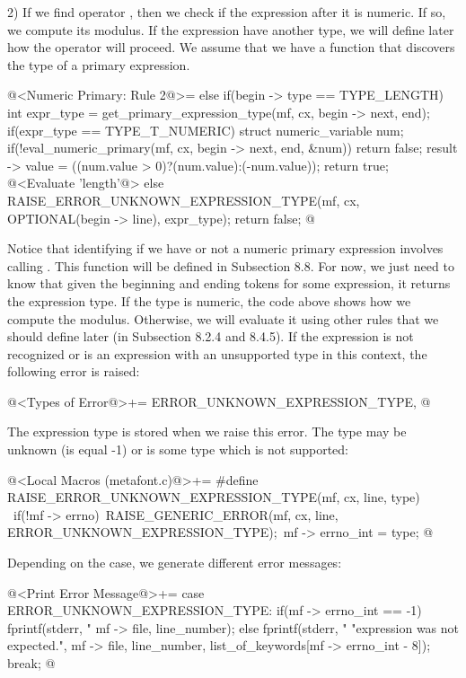 2) If we find operator , then we check if the
expression after it is numeric. If so, we compute its modulus. If the
expression have another type, we will define later how the operator
will proceed. We assume that we have a function that discovers the
type of a primary expression.

\iniciocodigo
@<Numeric Primary: Rule 2@>=
else if(begin -> type == TYPE_LENGTH){
  int expr_type = get_primary_expression_type(mf, cx, begin -> next, end);
  if(expr_type == TYPE_T_NUMERIC){
    struct numeric_variable num;
    if(!eval_numeric_primary(mf, cx, begin -> next, end, &num))
      return false;
    result -> value = ((num.value > 0)?(num.value):(-num.value));
    return true;
  }
  @<Evaluate 'length'@>
  else{
    RAISE_ERROR_UNKNOWN_EXPRESSION_TYPE(mf, cx, OPTIONAL(begin -> line),
                                       expr_type);
    return false;
  }
}
@
\fimcodigo

Notice that identifying if we have or not a numeric primary expression
involves calling . This
function will be defined in Subsection 8.8. For now, we just need to
know that given the beginning and ending tokens for some expression,
it returns the expression type. If the type is numeric, the code above
shows how we compute the modulus. Otherwise, we will evaluate it using
other rules that we should define later (in Subsection 8.2.4 and
8.4.5). If the expression is not recognized or is an expression with
an unsupported type in this context, the following error is raised:

\iniciocodigo
@<Types of Error@>+=
ERROR_UNKNOWN_EXPRESSION_TYPE,
@
\fimcodigo

The expression type is stored when we raise this error. The type may
be unknown (is equal -1) or is some type which is not supported:

\iniciocodigo
@<Local Macros (metafont.c)@>+=
#define RAISE_ERROR_UNKNOWN_EXPRESSION_TYPE(mf, cx, line, type) {\
  if(!mf -> errno){\
    RAISE_GENERIC_ERROR(mf, cx, line, ERROR_UNKNOWN_EXPRESSION_TYPE);\
    mf -> errno_int = type;}}
@
\fimcodigo

Depending on the case, we generate different error messages:

\iniciocodigo
@<Print Error Message@>+=
case ERROR_UNKNOWN_EXPRESSION_TYPE:
  if(mf -> errno_int == -1)
    fprintf(stderr, "%
            mf -> file, line_number);
  else
    fprintf(stderr, "%
                    "expression was not expected.", mf -> file, line_number,
                    list_of_keywords[mf -> errno_int - 8]);
  break;
@
\fimcodigo


